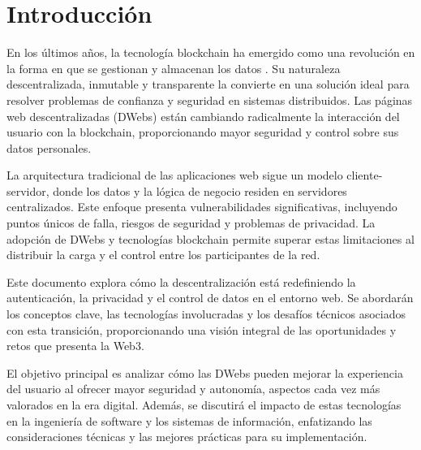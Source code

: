 \section{Introducción}

En los últimos años, la tecnología blockchain ha emergido como una revolución en la forma en que se gestionan y almacenan los datos \cite{nakamoto2008bitcoin}. Su naturaleza descentralizada, inmutable y transparente la convierte en una solución ideal para resolver problemas de confianza y seguridad en sistemas distribuidos. Las páginas web descentralizadas (DWebs) están cambiando radicalmente la interacción del usuario con la blockchain, proporcionando mayor seguridad y control sobre sus datos personales.

La arquitectura tradicional de las aplicaciones web sigue un modelo cliente-servidor, donde los datos y la lógica de negocio residen en servidores centralizados. Este enfoque presenta vulnerabilidades significativas, incluyendo puntos únicos de falla, riesgos de seguridad y problemas de privacidad. La adopción de DWebs y tecnologías blockchain permite superar estas limitaciones al distribuir la carga y el control entre los participantes de la red.

Este documento explora cómo la descentralización está redefiniendo la autenticación, la privacidad y el control de datos en el entorno web. Se abordarán los conceptos clave, las tecnologías involucradas y los desafíos técnicos asociados con esta transición, proporcionando una visión integral de las oportunidades y retos que presenta la Web3.

El objetivo principal es analizar cómo las DWebs pueden mejorar la experiencia del usuario al ofrecer mayor seguridad y autonomía, aspectos cada vez más valorados en la era digital. Además, se discutirá el impacto de estas tecnologías en la ingeniería de software y los sistemas de información, enfatizando las consideraciones técnicas y las mejores prácticas para su implementación.

